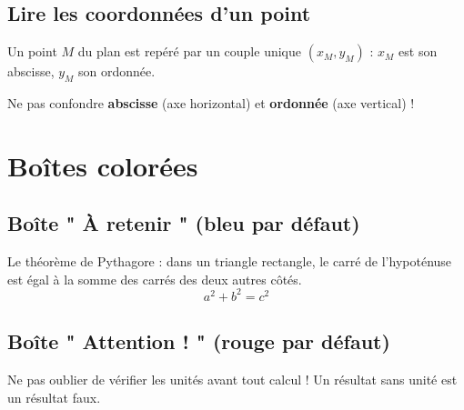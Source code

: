 \documentclass[11pt,a4paper]{article}
\begin{document}
\begin{center}
\reperegradue[bg={(-3,-3)}, hd={(5,5)},
              points={A/(3,2)/blue, B/(-2,1)/green, C/(1,-2)/red}]
\end{center}

\subsection{Lire les coordonnées d'un point}

\begin{retenir}
    Un point $M$ du plan est repéré par un couple unique $(x_M, y_M)$ :
    $x_M$ est son abscisse, $y_M$ son ordonnée.
\end{retenir}

\begin{center}
\reperegradue[bg={(-4,-4)}, hd={(4,4)},
              points={M/(2,3)/orange}]
\end{center}

\begin{vigilance}
    Ne pas confondre \textbf{abscisse} (axe horizontal) et
    \textbf{ordonnée} (axe vertical) !
\end{vigilance}

\section{Boîtes colorées}

\subsection{Boîte " À retenir " (bleu par défaut)}

\begin{retenir}
    Le théorème de Pythagore : dans un triangle rectangle, le carré de
    l'hypoténuse est égal à la somme des carrés des deux autres côtés.
    \[
        a^2 + b^2 = c^2
    \]
\end{retenir}

\subsection{Boîte " Attention ! " (rouge par défaut)}

\begin{vigilance}
    Ne pas oublier de vérifier les unités avant tout calcul !
    Un résultat sans unité est un résultat faux.
\end{vigilance}
\end{document}
